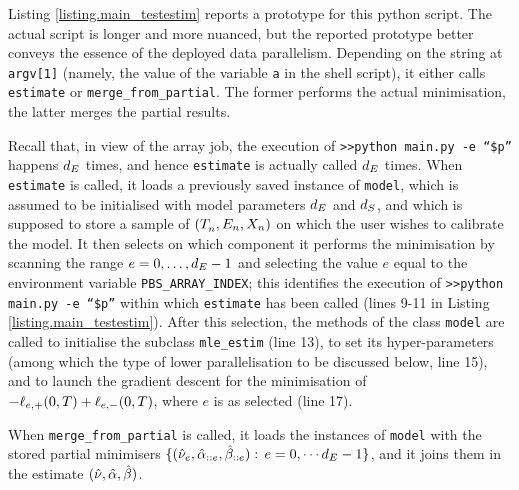 \documentclass[10pt, article,table]{article}
\begin{document}
Listing \ref{listing.main_testestim} reports a prototype for this python script. The actual script is longer and more nuanced, but the reported prototype better conveys the essence of the deployed data parallelism. Depending on the string at \texttt{argv[1]} (namely, the value of the variable \texttt{a} in the shell script), it either calls \texttt{estimate} or \texttt{merge\_from\_partial}. The former performs the actual minimisation, the latter merges the partial results. 

Recall that, in view of the array job, the execution of \texttt{>>python main.py -e ``\$p''} happens $\numEventTypes$ times, and hence \texttt{estimate} is actually called $\numEventTypes$ times. When \texttt{estimate} is called, it loads a previously saved instance of \texttt{model}, which is assumed to be initialised with model parameters $\numEventTypes$ and $\numStates$, and which is supposed to store a sample of $(\arrivalTimes[]_n, \event[n], \stateVariable_n)$ on which the user wishes to calibrate the model. It then selects on which component it performs the minimisation by scanning the range $e=0,\dots, \numEventTypes -1$ and  selecting the value $e$ equal to the environment variable \texttt{PBS\_ARRAY\_INDEX}; this identifies the execution of \texttt{>>python main.py -e ``\$p''} within which \texttt{estimate} has been called (lines 9-11 in Listing \ref{listing.main_testestim}). After this selection, the methods of the class \texttt{model} are called to initialise the subclass \texttt{mle\_estim} (line 13), to set its hyper-parameters (among which the type of lower parallelisation to be discussed below, line 15), and to launch the gradient descent for the minimisation of  $ -\leplus(0,\timeHorizon) + \leminus(0,\timeHorizon)$, where $e$ is as selected (line 17). 

When \texttt{merge\_from\_partial} is called, it loads the instances of \texttt{model} with the stored partial minimisers $\lbrace(\hat{\baseRate}_e,\hat{\impCoef}\subscriptdotse,\hat{\decCoef}\subscriptdotse): \, e=0,\dotsm \numEventTypes -1 \rbrace $, and it joins them in the estimate $(\hat{\baseRate},\hat{\impCoef},\hat{\decCoef})$.




\end{document}
